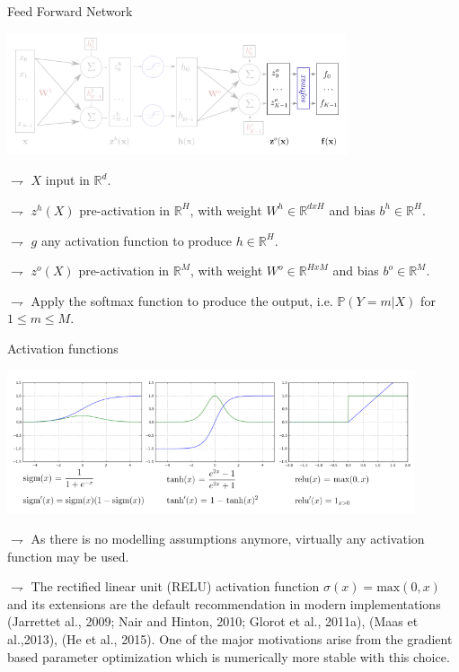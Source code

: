 \documentclass[9pt]{beamer}
\newcommand\R{\mathds{R}}
\begin{document}
\begin{frame}{Feed Forward Network}

\begin{center}
\includegraphics[width = 0.75\textwidth]{ffnn4.png}
\end{center}

$\rightharpoondown$ $X$ \alert{input in $\R^d$}.

$\rightharpoondown$ $z^h(X)$ \alert{pre-activation in $\R^H$}, with \alert{weight $W^h\in\R^{dxH}$} and \alert{bias $b^h\in\R^H$}.

$\rightharpoondown$ $g$ \alert{any activation function} to produce $h\in\R^H$.

$\rightharpoondown$ $z^o(X)$ \alert{pre-activation in $\R^M$}, with \alert{weight $W^o\in\R^{HxM}$} and \alert{bias $b^o\in\R^M$}.

$\rightharpoondown$  Apply the \alert{softmax function to produce the output}, i.e. $\mathbb{P}(Y=m|X)$ for $1\leqslant m \leqslant M$.
\end{frame}

\begin{frame}{Activation functions}

\begin{center}
\includegraphics[width = 0.9\textwidth]{activations.png}
\end{center}

$\rightharpoondown$ As there is no modelling assumptions anymore, \alert{virtually any activation function} may be used. 

$\rightharpoondown$ The rectified linear unit (RELU) activation function $\sigma(x) = \mathrm{max}(0,x)$ and its extensions are the default recommendation in modern implementations  (Jarrettet al., 2009; Nair and Hinton, 2010; Glorot et al., 2011a), (Maas et al.,2013),  (He et al., 2015). One of the major motivations arise from the \alert{gradient based parameter optimization which is numerically more stable with this choice}. 

\end{frame}
\end{document}
